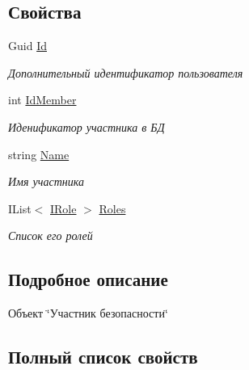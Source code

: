 \subsection*{Свойства}
\begin{DoxyCompactItemize}
\item 
Guid \hyperlink{interface_security_1_1_interfaces_1_1_model_1_1_i_member_aba69b15096837f7fbc3e480b34526f89}{Id}
\begin{DoxyCompactList}\small\item\em Дополнительный идентификатор пользователя \end{DoxyCompactList}\item 
int \hyperlink{interface_security_1_1_interfaces_1_1_model_1_1_i_member_a004b980b1b5ffbc478fa2a399a00a92a}{Id\+Member}
\begin{DoxyCompactList}\small\item\em Иденификатор участника в БД \end{DoxyCompactList}\item 
string \hyperlink{interface_security_1_1_interfaces_1_1_model_1_1_i_member_ada238b5d1e61f57a316e8af89ca1e414}{Name}
\begin{DoxyCompactList}\small\item\em Имя участника \end{DoxyCompactList}\item 
I\+List$<$ \hyperlink{interface_security_1_1_interfaces_1_1_model_1_1_i_role}{I\+Role} $>$ \hyperlink{interface_security_1_1_interfaces_1_1_model_1_1_i_member_a21577881d368df8632b3aa1cf827300f}{Roles}
\begin{DoxyCompactList}\small\item\em Список его ролей \end{DoxyCompactList}\end{DoxyCompactItemize}


\subsection{Подробное описание}
Объект \char`\"{}Участник безопасности\char`\"{} 



\subsection{Полный список свойств}
\mbox{\label{interface_security_1_1_interfaces_1_1_model_1_1_i_member_aba69b15096837f7fbc3e480b34526f89}} 
